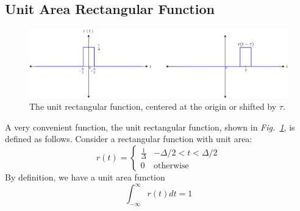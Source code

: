 \subsection{Unit Area Rectangular Function}
\begin{figure}[tb]
\centering
\includegraphics[width=1\columnwidth]{rect_func}
\caption{The unit rectangular function, centered at the origin or shifted by $\tau$. }
\label{fig:fun_rect}
\end{figure}
A very convenient function, the unit rectangular function, shown in \emph{Fig.~\ref{fig:fun_rect}}, is defined as follows.  Consider a rectangular function with unit area:
    \begin{equation}
        r(t) = \left\{ 
        \begin{array}{cc} 
        \frac{1}{\Delta} & -\Delta/2 < t < \Delta/2 \\ 
        0  & \mathrm{otherwise} 
        \end{array} \right.
    \end{equation}
 By definition, we have a unit area function
    \begin{equation}
        \int_{-\infty}^{\infty} r(t) dt = 1
    \end{equation}
